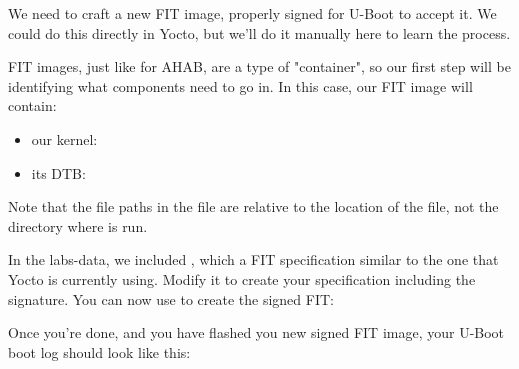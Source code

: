 We need to craft a new FIT image, properly signed for U-Boot to accept it.
We could do this directly in Yocto, but we'll do it manually here to learn the process.

FIT images, just like for AHAB, are a type of "container", so our first step will be identifying what components
need to go in.
In this case, our FIT image will contain:
\begin{itemize}
  \item our kernel: 
  \item its DTB: 
\end{itemize}
Note that the file paths in the  file are relative to the location
of the  file, not the directory where  is run.

In the labs-data, we included , which a FIT specification similar to the one
that Yocto is currently using. Modify it to create your specification including the signature.
You can now use  to create the signed FIT:


Once you're done, and you have flashed you new signed FIT image, your U-Boot boot log should look like this:

